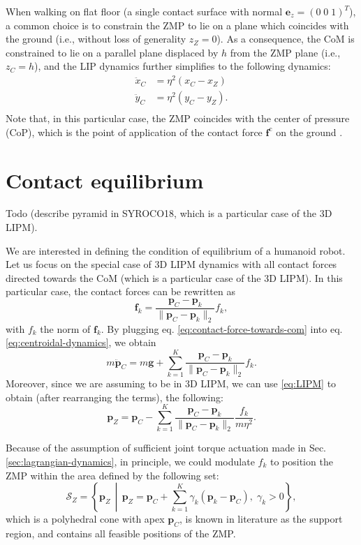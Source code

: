 When walking on flat floor (a single contact surface with normal
$\bm{e}_z=(0 \; 0\; 1)^T$),
a common choice is to constrain the ZMP to lie on
a plane which coincides with the ground (i.e., without loss of generality
$z_Z=0$). As a consequence, the CoM is constrained to lie on a parallel plane
displaced by $h$ from the ZMP plane (i.e., $z_C=h$), and
the LIP dynamics further simplifies to the following dynamics:
\begin{align*}
    \ddot{x}_C &= \eta^2 (x_C - x_Z) \\
    \ddot{y}_C &= \eta^2 (y_C - y_Z). \\
\end{align*}
Note that, in this particular case, the ZMP coincides with the center of
pressure (CoP), which is the point of application of the contact force
$\bm{f}^{\mathrm{c}}$ on the ground \cite{SardainBessonnet2004}.

\section{Contact equilibrium}
Todo (describe pyramid in SYROCO18, which is a particular case of the 3D LIPM).

We are interested in defining the condition of equilibrium of a humanoid robot.
Let us focus on the special case of 3D LIPM dynamics with all contact forces
directed towards the CoM (which is a particular case of the 3D LIPM).
In this particular case, the contact forces can be rewritten as
\begin{equation}
    \label{eq:contact-force-towards-com}
    \bm{f}_k = \frac{\bm{p}_C - \bm{p}_k}{\| \bm{p}_C - \bm{p}_k \|_2} f_k,
\end{equation}
with $f_k$ the norm of $\bm{f}_k$. By plugging eq.
\eqref{eq:contact-force-towards-com} into eq.
\eqref{eq:centroidal-dynamics}, we obtain
\begin{equation}
    m \ddot{\bm{p}}_C = m \bm{g} + \sum_{k=1}^K \frac{\bm{p}_C - \bm{p}_k}{\| \bm{p}_C - \bm{p}_k \|_2} f_k.
\end{equation}
Moreover, since we are assuming to be in 3D LIPM, we can use \eqref{eq:LIPM} to
obtain (after rearranging the terms), the following:
\begin{equation*}
    \bm{p}_Z = \bm{p}_C - \sum_{k=1}^K \frac{\bm{p}_C - \bm{p}_k}{\| \bm{p}_C - \bm{p}_k \|_2} \frac{f_k}{m \eta^2}.
\end{equation*}

Because of the assumption of sufficient joint torque actuation made in Sec.
\ref{sec:lagrangian-dynamics}, in principle, we could modulate $f_k$ to position
the ZMP within the area defined by the following set:
\begin{equation}
    \mathcal{S}_Z = \left\{ \bm{p}_Z \,\middle\vert\, \bm{p}_Z = \bm{p}_C + \sum_{k=1}^K \gamma_k (\bm{p}_k - \bm{p}_C), \; \gamma_k > 0  \right\},
\end{equation}
which is a polyhedral cone with apex $\bm{p}_C$,
is known in literature as the support region, and  contains all feasible
positions of the ZMP.
